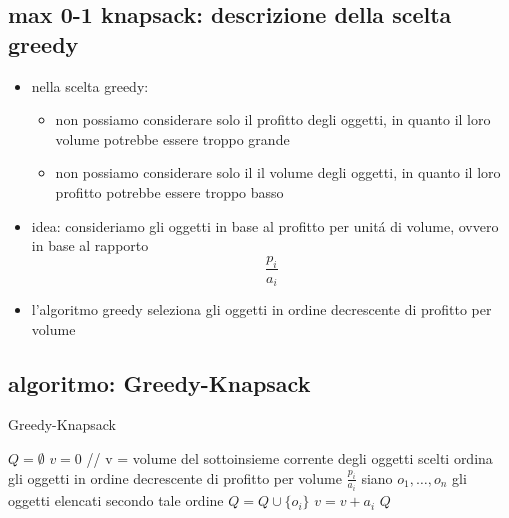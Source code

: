 
\subsection*{max 0-1 knapsack: descrizione della scelta greedy}
\begin{flushleft}
	\begin{itemize}
		\item nella scelta greedy:
		\begin{itemize}
			\item non possiamo considerare solo il profitto degli oggetti, in quanto il loro volume potrebbe essere troppo grande
			\item non possiamo considerare solo il il volume degli oggetti, in quanto il loro profitto potrebbe essere troppo basso
		\end{itemize}
		\item idea: consideriamo gli oggetti in base al profitto per unit\'a di volume, ovvero in base al rapporto $$\frac{p_i}{a_i}$$
		\item l'algoritmo greedy seleziona gli oggetti in ordine decrescente di profitto per volume
	\end{itemize}
\end{flushleft}


\newpage
\subsection*{algoritmo: Greedy-Knapsack}
\begin{flushleft}
	\begin{algorithm}
		\caption{Greedy-Knapsack}
		\begin{algorithmic}
			\STATE $Q=\emptyset$
			\STATE $v=0$
			\STATE \color{gray} // v = volume del sottoinsieme corrente degli oggetti scelti \color{black}
			\STATE ordina gli oggetti in ordine decrescente di profitto per volume $\frac{p_i}{a_i}$
			\STATE siano $o_1,\ldots,o_n$ gli oggetti elencati secondo tale ordine
					\STATE $Q=Q\cup\{o_i\}$
					\STATE $v=v+a_i$
				\ENDIF
			\ENDFOR
			\RETURN $Q$
		\end{algorithmic}
	\end{algorithm}
\end{flushleft}

